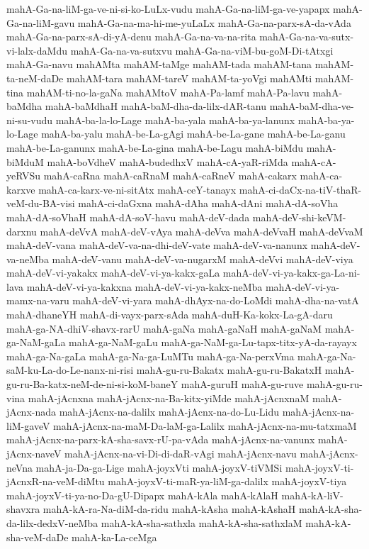 {mahA-Ga-na-liM-ga-ve-ni-si-ko-LuLx-vudu
mahA-Ga-na-liM-ga-ve-yapapx
mahA-Ga-na-liM-gavu
mahA-Ga-na-ma-hi-me-yuLaLx
mahA-Ga-na-parx-sA-da-vAda
mahA-Ga-na-parx-sA-di-yA-denu
mahA-Ga-na-va-na-rita
mahA-Ga-na-va-sutx-vi-lalx-daMdu
mahA-Ga-na-va-sutxvu
mahA-Ga-na-viM-bu-goM-Di-tAtxgi
mahA-Ga-navu
mahAMta
mahAM-taMge
mahAM-tada
mahAM-tana
mahAM-ta-neM-daDe
mahAM-tara
mahAM-tareV
mahAM-ta-yoVgi
mahAMti
mahAM-tina
mahAM-ti-no-la-gaNa
mahAMtoV
mahA-Pa-lamf
mahA-Pa-lavu
mahA-baMdha
mahA-baMdhaH
mahA-baM-dha-da-lilx-dAR-tanu
mahA-baM-dha-ve-ni-su-vudu
mahA-ba-la-lo-Lage
mahA-ba-yala
mahA-ba-ya-lanunx
mahA-ba-ya-lo-Lage
mahA-ba-yalu
mahA-be-La-gAgi
mahA-be-La-gane
mahA-be-La-ganu
mahA-be-La-ganunx
mahA-be-La-gina
mahA-be-Lagu
mahA-biMdu
mahA-biMduM
mahA-boVdheV
mahA-budedhxV
mahA-cA-yaR-riMda
mahA-cA-yeRVSu
mahA-caRna
mahA-caRnaM
mahA-caRneV
mahA-cakarx
mahA-ca-karxve
mahA-ca-karx-ve-ni-sitAtx
mahA-ceY-tanayx
mahA-ci-daCx-na-tiV-thaR-veM-du-BA-visi
mahA-ci-daGxna
mahA-dAha
mahA-dAni
mahA-dA-soVha
mahA-dA-soVhaH
mahA-dA-soV-havu
mahA-deV-dada
mahA-deV-shi-keVM-darxnu
mahA-deVvA
mahA-deV-vAya
mahA-deVva
mahA-deVvaH
mahA-deVvaM
mahA-deV-vana
mahA-deV-va-na-dhi-deV-vate
mahA-deV-va-nanunx
mahA-deV-va-neMba
mahA-deV-vanu
mahA-deV-va-nugarxM
mahA-deVvi
mahA-deV-viya
mahA-deV-vi-yakakx
mahA-deV-vi-ya-kakx-gaLa
mahA-deV-vi-ya-kakx-ga-La-ni-lava
mahA-deV-vi-ya-kakxna
mahA-deV-vi-ya-kakx-neMba
mahA-deV-vi-ya-mamx-na-varu
mahA-deV-vi-yara
mahA-dhAyx-na-do-LoMdi
mahA-dha-na-vatA
mahA-dhaneYH
mahA-di-vayx-parx-sAda
mahA-duH-Ka-kokx-La-gA-daru
mahA-ga-NA-dhiV-shavx-rarU
mahA-gaNa
mahA-gaNaH
mahA-gaNaM
mahA-ga-NaM-gaLa
mahA-ga-NaM-gaLu
mahA-ga-NaM-ga-Lu-tapx-titx-yA-da-rayayx
mahA-ga-Na-gaLa
mahA-ga-Na-ga-LuMTu
mahA-ga-Na-perxVma
mahA-ga-Na-saM-ku-La-do-Le-nanx-ni-risi
mahA-gu-ru-Bakatx
mahA-gu-ru-BakatxH
mahA-gu-ru-Ba-katx-neM-de-ni-si-koM-baneY
mahA-guruH
mahA-gu-ruve
mahA-gu-ru-vina
mahA-jAcnxna
mahA-jAcnx-na-Ba-kitx-yiMde
mahA-jAcnxnaM
mahA-jAcnx-nada
mahA-jAcnx-na-dalilx
mahA-jAcnx-na-do-Lu-Lidu
mahA-jAcnx-na-liM-gaveV
mahA-jAcnx-na-maM-Da-laM-ga-Lalilx
mahA-jAcnx-na-mu-tatxmaM
mahA-jAcnx-na-parx-kA-sha-savx-rU-pa-vAda
mahA-jAcnx-na-vanunx
mahA-jAcnx-naveV
mahA-jAcnx-na-vi-Di-di-daR-vAgi
mahA-jAcnx-navu
mahA-jAcnx-neVna
mahA-ja-Da-ga-Lige
mahA-joyxVti
mahA-joyxV-tiVMSi
mahA-joyxV-ti-jAcnxR-na-veM-diMtu
mahA-joyxV-ti-maR-ya-liM-ga-dalilx
mahA-joyxV-tiya
mahA-joyxV-ti-ya-no-Da-gU-Dipapx
mahA-kAla
mahA-kAlaH
mahA-kA-liV-shavxra
mahA-kA-ra-Na-diM-da-ridu
mahA-kAsha
mahA-kAshaH
mahA-kA-sha-da-lilx-dedxV-neMba
mahA-kA-sha-sathxla
mahA-kA-sha-sathxlaM
mahA-kA-sha-veM-daDe
mahA-ka-La-ceMga
}
